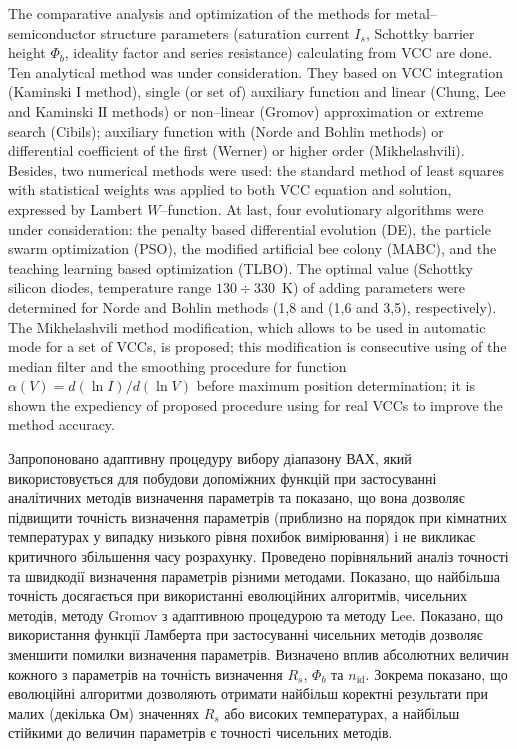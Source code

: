 The comparative analysis and optimization of the methods for metal--semiconductor structure parameters (saturation current $I_s$, Schottky barrier height $\Phi_b$, ideality factor and series resistance) calculating from VCC are done.
Ten analytical method was under consideration.
They based on VCC integration (Kaminski І method),
single (or set of) auxiliary function and linear (Chung, Lee and Kaminski ІІ methods) or non--linear (Gromov) approximation or extreme search  (Cibils);
 auxiliary function with (Norde and Bohlin methods) or differential coefficient of the first (Werner) or higher order (Mikhelashvili).
Besides, two numerical methods were used:
the standard method of least squares with statistical weights was applied to both VCC equation and solution, expressed by Lambert $W$--function.
At last, four evolutionary algorithms were under consideration: the penalty based differential evolution (DE), the particle swarm optimization (PSO), the modified artificial bee colony (MABC), and the teaching learning
based optimization (TLBO).
The optimal value (Schottky silicon diodes, temperature range $130\div330$~K) of adding parameters were determined
for Norde and Bohlin methods (1,8 and (1,6 and 3,5), respectively).
The Mikhelashvili method modification, which  allows to be used in automatic mode for a set of VCCs, is proposed;
this modification is consecutive using of the median filter and the smoothing procedure for 
function $\alpha(V)=d(\ln I)/d(\ln V)$ before maximum position determination;
it is shown the expediency of proposed procedure using for real VCCs to improve the method accuracy.

Запропоновано адаптивну процедуру вибору діапазону ВАХ, який використовується для побудови допоміжних функцій при застосуванні аналітичних методів визначення параметрів та показано, що вона дозволяє підвищити точність визначення параметрів (приблизно на порядок при кімнатних температурах у випадку низького рівня похибок вимірювання) і не викликає критичного збільшення часу розрахунку.
Проведено порівняльний аналіз точності  та швидкодії  визначення параметрів різними методами.
Показано, що найбільша точність досягається при використанні еволюцiйних алгоритмів, чисельних методів, методу Gromov з адаптивною процедурою та методу Lee.
Показано, що використання функції Ламберта при застосуванні чисельних методів дозволяє зменшити помилки визначення параметрів.
Визначено вплив абсолютних величин кожного з параметрів на точність визначення $R_s$, $\Phi_b$ та $n_\mathrm{id}$.
Зокрема показано, що еволюційні алгоритми дозволяють отримати найбільш коректні результати при малих (декілька Ом) значеннях $R_s$ або високих температурах, а найбільш стійкими до величин параметрів є точності чисельних методів.

